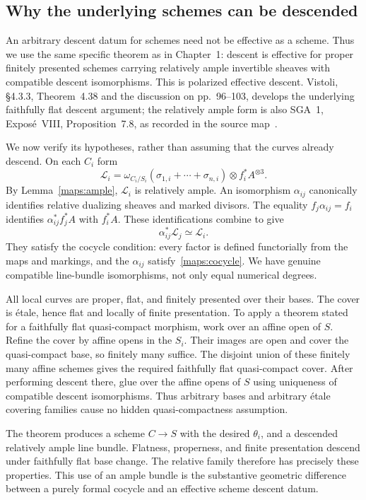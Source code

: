 \subsection{Why the underlying schemes can be descended}

An arbitrary descent datum for schemes need not be effective as a scheme. Thus we use the same specific theorem as in Chapter~1: descent is effective for proper finitely presented schemes carrying relatively ample invertible sheaves with compatible descent isomorphisms. This is polarized effective descent. Vistoli, \S4.3.3, Theorem~4.38 and the discussion on pp.~96--103, develops the underlying faithfully flat descent argument; the relatively ample form is also SGA~1, Expos\'e~VIII, Proposition~7.8, as recorded in the source map~\cite{Vistoli,SGA1}.

We now verify its hypotheses, rather than assuming that the curves already descend. On each $C_i$ form
\[
 \mathcal L_i=\omega_{C_i/S_i}(\sigma_{1,i}+\cdots+\sigma_{n,i})\otimes f_i^*A^{\otimes3}.
\]
By Lemma~\ref{maps:ample}, $\mathcal L_i$ is relatively ample. An isomorphism $\alpha_{ij}$ canonically identifies relative dualizing sheaves and marked divisors. The equality $f_j\alpha_{ij}=f_i$ identifies $\alpha_{ij}^*f_j^*A$ with $f_i^*A$. These identifications combine to give
\[
 \alpha_{ij}^*\mathcal L_j\simeq\mathcal L_i.
\]
They satisfy the cocycle condition: every factor is defined functorially from the maps and markings, and the $\alpha_{ij}$ satisfy~\eqref{maps:cocycle}. We have genuine compatible line-bundle isomorphisms, not only equal numerical degrees.

All local curves are proper, flat, and finitely presented over their bases. The cover is \'etale, hence flat and locally of finite presentation. To apply a theorem stated for a faithfully flat quasi-compact morphism, work over an affine open of $S$. Refine the cover by affine opens in the $S_i$. Their images are open and cover the quasi-compact base, so finitely many suffice. The disjoint union of these finitely many affine schemes gives the required faithfully flat quasi-compact cover. After performing descent there, glue over the affine opens of $S$ using uniqueness of compatible descent isomorphisms. Thus arbitrary bases and arbitrary \'etale covering families cause no hidden quasi-compactness assumption.

The theorem produces a scheme $C\to S$ with the desired $\theta_i$, and a descended relatively ample line bundle. Flatness, properness, and finite presentation descend under faithfully flat base change. The relative family therefore has precisely these properties. This use of an ample bundle is the substantive geometric difference between a purely formal cocycle and an effective scheme descent datum.


